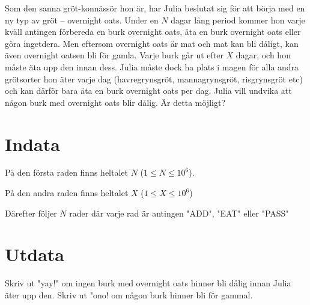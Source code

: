 
Som den sanna gröt-konnässör hon är, har Julia beslutat sig för att börja med en ny typ av gröt --
overnight oats. Under en $N$ dagar lång period kommer hon varje kväll antingen förbereda en burk overnight
oats, äta en burk overnight oats eller göra ingetdera. Men eftersom overnight oats är mat och mat kan
bli dåligt, kan även overnight oatsen bli för gamla. Varje burk går ut efter $X$ dagar, och hon
måste äta upp den innan dess. Julia måste dock ha plats i magen för alla andra grötsorter hon
äter varje dag (havregrynsgröt, mannagrynsgröt, risgrynsgröt etc) och kan därför bara äta en burk
overnight oats per dag. Julia vill undvika att någon burk med overnight oats blir dålig. Är detta
möjligt?

\section*{Indata}
På den första raden finns heltalet $N$ ($1 \le N \le 10^6$).

På den andra raden finns heltalet $X$ ($1 \le X \le 10^6$)

Därefter följer $N$ rader där varje rad är antingen "ADD", "EAT" eller
"PASS"

\section*{Utdata}
Skriv ut "yay!" om ingen burk med overnight oats hinner bli dålig innan Julia äter upp den.
Skriv ut "ono! om någon burk hinner bli för gammal.

